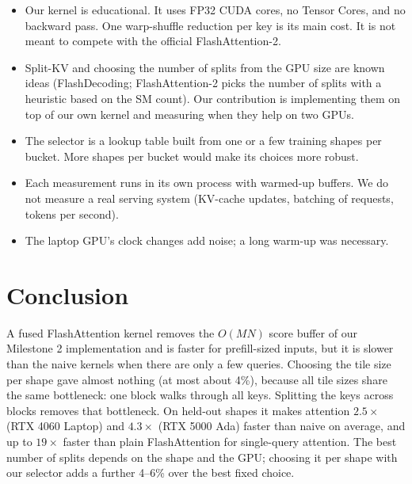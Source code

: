 \documentclass[11pt]{article}
\begin{document}
\begin{itemize}
  \item Our kernel is educational. It uses FP32 CUDA cores, no Tensor Cores, and
        no backward pass. One warp-shuffle reduction per key is its main cost.
        It is not meant to compete with the official FlashAttention-2.
  \item Split-KV and choosing the number of splits from the GPU size are known
        ideas (FlashDecoding; FlashAttention-2 picks the number of splits with a
        heuristic based on the SM count). Our contribution is implementing them on
        top of our own kernel and measuring when they help on two GPUs.
  \item The selector is a lookup table built from one or a few training shapes
        per bucket. More shapes per bucket would make its choices more robust.
  \item Each measurement runs in its own process with warmed-up buffers. We do
        not measure a real serving system (KV-cache updates, batching of
        requests, tokens per second).
  \item The laptop GPU's clock changes add noise; a long warm-up was necessary.
\end{itemize}

\section{Conclusion}

A fused FlashAttention kernel removes the $O(MN)$ score buffer of our
Milestone 2 implementation and is faster for prefill-sized inputs, but it is
slower than the naive kernels when there are only a few queries. Choosing
the tile size per shape gave almost nothing (at most about 4\%), because all
tile sizes share the same bottleneck: one block walks through all keys.
Splitting the keys across blocks removes that bottleneck. On held-out shapes it
makes attention $2.5\times$ (RTX 4060 Laptop) and $4.3\times$ (RTX 5000 Ada) faster
than naive on average, and up to $19\times$ faster than plain FlashAttention for
single-query attention. The best number of splits depends on the shape and the
GPU; choosing it per shape with our selector adds a further 4--6\% over the best
fixed choice.

\end{document}
